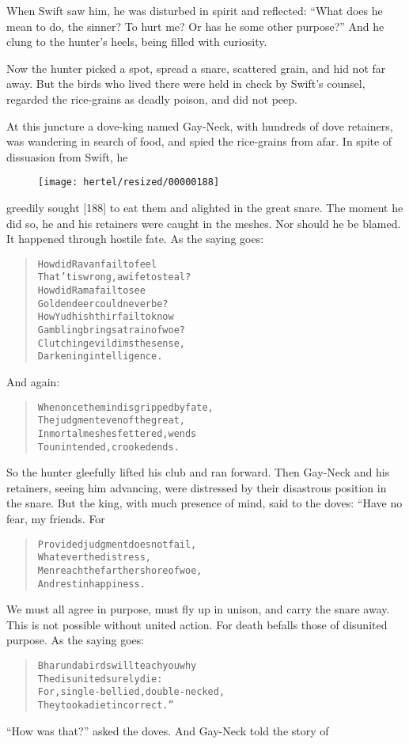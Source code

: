 \documentclass[article, twoside, 10pt]{memoir}
\renewenvironment{verbatim}{%
\begin{quote}%
\vskip -10pt%
\begin{alltt}\normalfont\small}{\end{alltt}%
\end{quote}%
\vskip -10pt
} %
\begin{document}
When Swift saw him, he was disturbed in spirit and reflected:
``What does he mean to do, the sinner? To hurt me? Or has he some other purpose?''
And he clung to the hunter's heels, being filled with curiosity.

Now the hunter picked a spot, spread a snare, scattered grain, and
hid not far away. But the birds who lived there were held in check
by Swift's counsel, regarded the rice-grains as deadly poison, and
did not peep.

At this juncture a dove-king named Gay-Neck, with hundreds of dove
retainers, was wandering in search of food, and spied the
rice-grains from afar. In spite of dissuasion from Swift, he
\begin{figure}[p]\texttt{[image: hertel/resized/00000188]}\end{figure}greedily sought [188] to eat them and alighted in the great snare.
The moment he did so, he and his retainers were caught in the
meshes. Nor should he be blamed. It happened through hostile fate.
As the saying goes:

\begin{verbatim}
How did Ravan fail to feel
That 'tis wrong, a wife to steal?
How did Rama fail to see
Golden deer could never be?
How Yudhishthir fail to know
Gambling brings a train of woe?
Clutching evil dims the sense,
Darkening intelligence.
\end{verbatim}
And again:

\begin{verbatim}
When once the mind is gripped by fate,
The judgment even of the great,
In mortal meshes fettered, wends
To unintended, crooked ends.
\end{verbatim}
So the hunter gleefully lifted his club and ran forward. Then
Gay-Neck and his retainers, seeing him advancing, were distressed
by their disastrous position in the snare. But the king, with much
presence of mind, said to the doves: “Have no fear, my friends.
For

\begin{verbatim}
Provided judgment does not fail,
    Whatever the distress,
Men reach the farther shore of woe,
    And rest in happiness.
\end{verbatim}
We must all agree in purpose, must fly up in unison, and carry the
snare away. This is not possible without united action. For death
befalls those of disunited purpose. As the saying goes:

\begin{verbatim}
Bharunda birds will teach you why
The disunited surely die:
For, single-bellied, double-necked,
They took a diet incorrect.”
\end{verbatim}
``How was that?'' asked the doves. And Gay-Neck told the story of
\end{document}
